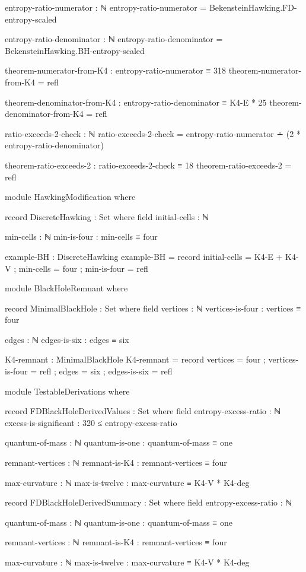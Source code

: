 \documentclass[11pt,a4paper]{book}
\begin{document}
\begin{code}
  entropy-ratio-numerator : ℕ
  entropy-ratio-numerator = BekensteinHawking.FD-entropy-scaled
  
  entropy-ratio-denominator : ℕ
  entropy-ratio-denominator = BekensteinHawking.BH-entropy-scaled
  
  theorem-numerator-from-K4 : entropy-ratio-numerator ≡ 318
  theorem-numerator-from-K4 = refl
  
  theorem-denominator-from-K4 : entropy-ratio-denominator ≡ K4-E * 25
  theorem-denominator-from-K4 = refl
  
  ratio-exceeds-2-check : ℕ
  ratio-exceeds-2-check = entropy-ratio-numerator ∸ (2 * entropy-ratio-denominator)
  
  theorem-ratio-exceeds-2 : ratio-exceeds-2-check ≡ 18
  theorem-ratio-exceeds-2 = refl

module HawkingModification where

  record DiscreteHawking : Set where
    field
      initial-cells : ℕ
      
      min-cells : ℕ
      min-is-four : min-cells ≡ four
      
  example-BH : DiscreteHawking
  example-BH = record
    { initial-cells = K4-E + K4-V
    ; min-cells = four
    ; min-is-four = refl
    }

module BlackHoleRemnant where

  record MinimalBlackHole : Set where
    field
      vertices : ℕ
      vertices-is-four : vertices ≡ four
      
      edges : ℕ
      edges-is-six : edges ≡ six
      
  K4-remnant : MinimalBlackHole
  K4-remnant = record
    { vertices = four
    ; vertices-is-four = refl
    ; edges = six
    ; edges-is-six = refl
    }
    
module TestableDerivations where

  record FDBlackHoleDerivedValues : Set where
    field
      entropy-excess-ratio : ℕ
      excess-is-significant : 320 ≤ entropy-excess-ratio
      
      quantum-of-mass : ℕ
      quantum-is-one : quantum-of-mass ≡ one
      
      remnant-vertices : ℕ
      remnant-is-K4 : remnant-vertices ≡ four
      
      max-curvature : ℕ
      max-is-twelve : max-curvature ≡ K4-V * K4-deg
      
  record FDBlackHoleDerivedSummary : Set where
    field
      entropy-excess-ratio : ℕ
      
      quantum-of-mass : ℕ
      quantum-is-one : quantum-of-mass ≡ one
      
      remnant-vertices : ℕ
      remnant-is-K4 : remnant-vertices ≡ four
      
      max-curvature : ℕ
      max-is-twelve : max-curvature ≡ K4-V * K4-deg
      
\end{code}
\end{document}
